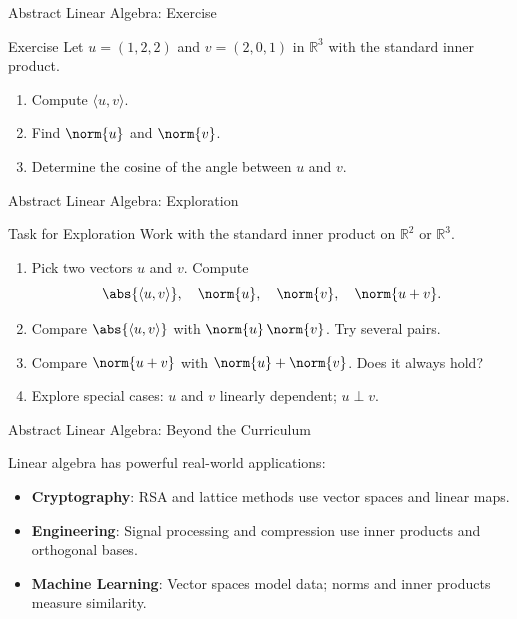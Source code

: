\cyanheader
\begin{frame}{Abstract Linear Algebra: Exercise}
\begin{cyanbox*}{Exercise}
Let $u=(1,2,2)$ and $v=(2,0,1)$ in $\mathbb{R}^3$ with the standard inner product.
\begin{enumerate}
    \item Compute $\langle u,v \rangle$.
    \item Find $\norm{u}$ and $\norm{v}$.
    \item Determine the cosine of the angle between $u$ and $v$.
\end{enumerate}
\end{cyanbox*}
\end{frame}

\grayheader
\begin{frame}{Abstract Linear Algebra: Exploration}
\begin{graybox*}{Task for Exploration}
Work with the standard inner product on $\mathbb{R}^2$ or $\mathbb{R}^3$.
\begin{enumerate}
    \item Pick two vectors $u$ and $v$. Compute
    \[
    \abs{\langle u,v\rangle}, \quad \norm{u}, \quad \norm{v}, \quad \norm{u+v}.
    \]
    \item Compare $\abs{\langle u,v\rangle}$ with $\norm{u}\,\norm{v}$. Try several pairs.
    \item Compare $\norm{u+v}$ with $\norm{u}+\norm{v}$. Does it always hold?
    \item Explore special cases: $u$ and $v$ linearly dependent; $u \perp v$.
\end{enumerate}
\end{graybox*}

\medskip
{}
\end{frame}


\blueheader
\begin{frame}{Abstract Linear Algebra: Beyond the Curriculum}

\warn

\medskip
Linear algebra has powerful real-world applications:
\begin{itemize}
    \item \textbf{Cryptography}: RSA and lattice methods use vector spaces and linear maps.
    \item \textbf{Engineering}: Signal processing and compression use inner products and orthogonal bases.
    \item \textbf{Machine Learning}: Vector spaces model data; norms and inner products measure similarity.
\end{itemize}

\end{frame}
